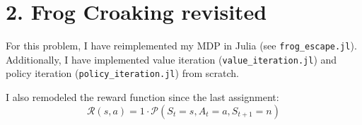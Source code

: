 \documentclass[12pt]{article}
\begin{document}
\clearpage
\section*{2. Frog Croaking revisited}
For this problem, I have reimplemented my MDP in Julia (see \texttt{frog\_escape.jl}). Additionally, I have implemented value iteration (\texttt{value\_iteration.jl}) and policy iteration (\texttt{policy\_iteration.jl}) from scratch.

I also remodeled the reward function since the last assignment:
$$\mathcal{R}(s, a) = 1 \cdot \mathcal{P}(S_t = s, A_t = a, S_{t+1} = n)$$

\end{document}
